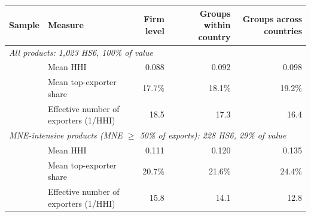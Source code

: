 \begin{tabular}{llrrr}
\toprule
Sample & Measure & Firm level & Groups within country & Groups across countries \\
\midrule
\multicolumn{5}{l}{\textit{All products: 1,023 HS6, 100\% of value}} \\
 & Mean HHI & 0.088 & 0.092 & 0.098 \\
 & Mean top-exporter share & 17.7\% & 18.1\% & 19.2\% \\
 & Effective number of exporters (1/HHI) & 18.5 & 17.3 & 16.4 \\
\multicolumn{5}{l}{\textit{MNE-intensive products (MNE $\geq$ 50\% of exports): 228 HS6, 29\% of value}} \\
 & Mean HHI & 0.111 & 0.120 & 0.135 \\
 & Mean top-exporter share & 20.7\% & 21.6\% & 24.4\% \\
 & Effective number of exporters (1/HHI) & 15.8 & 14.1 & 12.8 \\
\bottomrule
\end{tabular}
